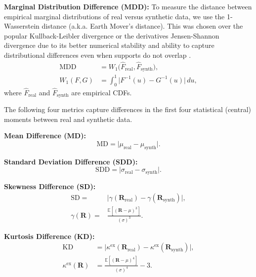       \begin{enumerate}[label=\textbf{[M\arabic*]}]
        \item \label{metric:mdd} \textbf{Marginal Distribution 
        Difference (MDD):}  
        To measure the distance between empirical marginal distributions
        of real versus synthetic data, we use the 1-Wasserstein distance
        (a.k.a. Earth Mover's distance). This was chosen over the 
        popular Kullback-Leibler divergence or the derivatives
        Jensen-Shannon divergence due to its better numerical stability
        and ability to capture distributional differences even when
        supports do not overlap \cite{Arjovsky17}.
        \[
        \begin{aligned}
          \mathrm{MDD} &= W_1\big(\widehat{F}_{\text{real}}, 
          \widehat{F}_{\text{synth}}\big), \\
          W_1(F, G) &= \int_0^1 \big|F^{-1}(u) - G^{-1}(u)\big|\,du,
          \end{aligned}
          \]
          where \(\widehat{F}_{\text{real}}\) and \(\widehat{F}_{\text{synth}}\) 
          are empirical CDFs.
          
          \end{enumerate}
          The following four metrics capture differences in the first four
          statistical (central) moments between real and synthetic data.
          \begin{enumerate}[label=\textbf{[M\arabic*]}, resume]
          
          \item \label{metric:md} \textbf{Mean Difference (MD):}  
          \[
          \mathrm{MD} = \big|\mu_{\text{real}} - \mu_{\text{synth}}\big|.
          \]
          
          \item \label{metric:sdd} \textbf{Standard Deviation Difference (SDD):}  
          \[
          \mathrm{SDD} = \big|\sigma_{\text{real}} - \sigma_{\text{synth}}\big|.
          \]

          \item \label{metric:skewness} \textbf{Skewness Difference (SD):}  
          \begin{align*}
          \mathrm{SD} =& \big|\gamma(\mathbf{R}_{\text{real}}) - \gamma(\mathbf{R}_{\text{synth}})\big|, \\
          \gamma(\mathbf{R}) =& \frac{\mathbb{E}[(\mathbf{R} - \mu)^3]}{(\sigma)^3}.
          \end{align*}
          
          \item \label{metric:kd} \textbf{Kurtosis Difference (KD):}  
          \begin{align*}
          \mathrm{KD} &= \big|\kappa^{\mathrm{ex}}(\mathbf{R}_{\text{real}}) 
          - \kappa^{\mathrm{ex}}(\mathbf{R}_{\text{synth}})\big|, \\
          \kappa^{\mathrm{ex}}(\mathbf{R}) &= \frac{\mathbb{E}[(\mathbf{R} - \mu)^4]}{(\sigma)^4} - 3.
          \end{align*}
          
          \end{enumerate}
          
